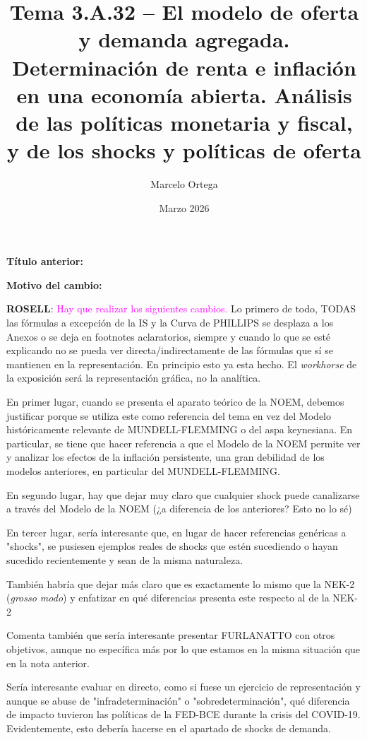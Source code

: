 \documentclass[10pt,a4paper]{article}
\title{Tema 3.A.32 -- El modelo de oferta y demanda agregada.\\
\large Determinación de renta e inflación en una economía abierta. Análisis de las políticas monetaria y fiscal, y de los shocks y políticas de oferta}
\author{Marcelo Ortega}
\date{Marzo 2026}
\newcommand{\puntosclave}[1]{%
  \begin{tcolorbox}[
    colframe=black,
    title={Puntos clave},
    before upper={\setlength{\parindent}{0.5cm}\setlength{\parskip}{0.5\baselineskip}}
  ]
  #1
  \end{tcolorbox}
}
\newcommand{\modificaciones}[1]{
  \begin{tcolorbox}[
    colback=white,
    colframe=red,
    title={Modificaciones a realizar},
    before upper={\setlength{\parindent}{0.5cm}\setlength{\parskip}{0.5\baselineskip}}
  ]
  #1
  \end{tcolorbox}
}
\newcommand{\changebox}{%
\begin{tcolorbox}[title={Historial de cambios del tema}]
\textbf{Título anterior:} \OldTitle\par
\textbf{Motivo del cambio:} \ChangeWhy
\end{tcolorbox}
}
\begin{document}
\maketitle
\changebox

\newpage

\puntosclave{ %
    }
\vspace{1cm}

\modificaciones{
    \textbf{ROSELL}: \textcolor{magenta}{Hay que realizar los siguientes cambios.} Lo primero de todo, TODAS las fórmulas a excepción de la IS y la Curva de PHILLIPS se desplaza a los Anexos o se deja en footnotes aclaratorios, siempre y cuando lo que se esté explicando no se pueda ver directa/indirectamente de las fórmulas que sí se mantienen en la representación. En principio esto ya esta hecho. El \textit{workhorse} de la exposición será la representación gráfica, no la analítica. 

    En primer lugar, cuando se presenta el aparato teórico de la NOEM, debemos justificar porque se utiliza este como referencia del tema en vez del Modelo históricamente relevante de MUNDELL-FLEMMING o del aspa keynesiana. En particular, se tiene que hacer referencia a que el Modelo de la NOEM permite ver y analizar los efectos de la inflación persistente, una gran debilidad de los modelos anteriores, en particular del MUNDELL-FLEMMING.

    En segundo lugar, hay que dejar muy claro que cualquier shock puede canalizarse a través del Modelo de la NOEM (¿a diferencia de los anteriores? Esto no lo sé)

    En tercer lugar, sería interesante que, en lugar de hacer referencias genéricas a "shocks", se pusiesen ejemplos reales de shocks que estén sucediendo o hayan sucedido recientemente y sean de la misma naturaleza. 

    También habría que dejar más claro que es exactamente lo mismo que la NEK-2 (\textit{grosso modo}) y enfatizar en qué diferencias presenta este respecto al de la NEK-2

    Comenta también que sería interesante presentar FURLANATTO con otros objetivos, aunque no específica más por lo que estamos en la misma situación que en la nota anterior. 

    Sería interesante evaluar en directo, como si fuese un ejercicio de representación y aunque se abuse de "infradeterminación" o "sobredeterminación", qué diferencia de impacto tuvieron las políticas de la FED-BCE durante la crisis del COVID-19. Evidentemente, esto debería hacerse en el apartado de shocks de demanda. 

}
\end{document}
